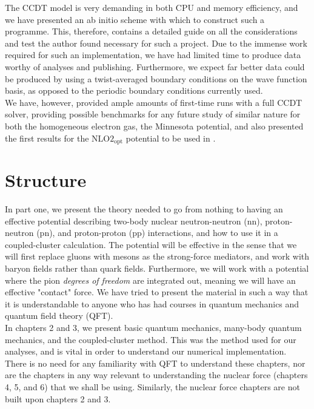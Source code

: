 \documentclass[10pt,twoside]{report}
\begin{document}
	The CCDT model is very demanding in both CPU and memory efficiency, and we have presented an ab initio scheme with which to construct such a programme. This, therefore, contains a detailed guide on all the considerations and test the author found necessary for such a project. Due to the immense work required for such an implementation, we have had limited time to produce data worthy of analyses and publishing. Furthermore, we expect far better data could be produced by using a twist-averaged boundary conditions on the wave function basis, as opposed to the periodic boundary conditions currently used.\\
	
	We have, however, provided ample amounts of first-time runs with a full CCDT solver, providing possible benchmarks for any future study of similar nature for both the homogeneous electron gas, the Minnesota potential, and also presented the first results for the $\text{NLO2}_{\text{opt}}$ potential \cite{HJensenEtAl13} to be used in \cite{MillerHjorthJensen17}.\\
	
	
	
	\section{Structure}
	In part one, we present the theory needed to go from nothing to having an effective potential describing two-body nuclear neutron-neutron (nn), proton-neutron (pn), and proton-proton (pp) interactions, and how to use it in a coupled-cluster calculation. The potential will be effective in the sense that we will first replace gluons with mesons as the strong-force mediators, and work with baryon fields rather than quark fields. Furthermore, we will work with a potential where the pion \emph{degrees of freedom} are integrated out, meaning we will have an effective "contact" force. We have tried to present the material in such a way that it is understandable to anyone who has had courses in quantum mechanics and quantum field theory (QFT).\\
	
	In chapters 2 and 3, we present basic quantum mechanics, many-body quantum mechanics, and the coupled-cluster method. This was the method used for our analyses, and is vital in order to understand our numerical implementation. There is no need for any familiarity with QFT to understand these chapters, nor are the chapters in any way relevant to understanding the nuclear force (chapters 4, 5, and 6) that we shall be using. Similarly, the nuclear force chapters are not built upon chapters 2 and 3.\\
	
\end{document}
